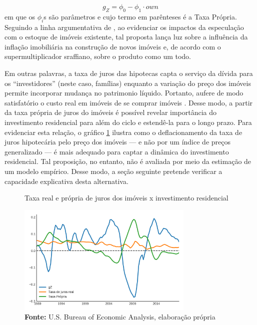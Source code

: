 \begin{equation}
g_Z = \phi_0 - \phi_1\cdot own
\end{equation}
em que os $\phi_i$s são parâmetros e cujo termo em parênteses é a Taxa Própria. 
Seguindo a linha argumentativa de \textcite{teixeira_crescimento_2015}, ao evidenciar os impactos da especulação com o estoque de imóveis existente, tal proposta lança luz sobre a influência da inflação imobiliária na construção de novos imóveis e, de acordo com o supermultiplicador sraffiano, sobre o produto como um todo. 

Em outras palavras, a taxa de juros das hipotecas capta o serviço da dívida para os ``investidores'' (neste caso, famílias) enquanto a variação do preço dos imóveis permite incorporar mudança no patrimonio líquido. Portanto, aufere de modo satisfatório o custo real em imóveis de se comprar imóveis \cite[p.~53]{teixeira_crescimento_2015}. Desse modo, a partir da taxa própria de juros do imóveis é possível revelar importância do investimento residencial para além do ciclo e estendê-la para o longo prazo.  Para evidenciar esta relação, o gráfico \ref{gZ_Propria} ilustra como  o deflacionamento da taxa de juros hipotecária pelo preço dos imóveis --- e não por um índice de preços generalizado --- é mais adequado para captar a dinâmica do investimento residencial. Tal proposição, no entanto, não é avaliada por meio da estimação de um modelo empírico. Desse modo, a seção seguinte pretende verificar a capacidade explicativa desta alternativa.

 
\begin{figure}[htb]
	\centering
	\caption{Taxa real e própria de juros dos imóveis x investimento residencial}
	\label{gZ_Propria}
	\includegraphics[width=0.75\textwidth]{Fatos_Estilizados/Figs/TxPropria_Investo.png}
	\caption*{\textbf{Fonte:} U.S. Bureau of Economic Analysis, elaboração própria}
\end{figure}
